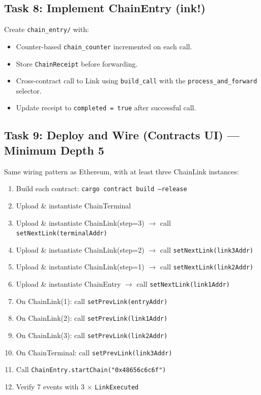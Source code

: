 \documentclass[11pt,a4paper]{article}
\begin{document}
\subsection{Task 8: Implement ChainEntry (ink!)}

Create \texttt{chain\_entry/} with:

\begin{itemize}
    \item Counter-based \texttt{chain\_counter} incremented on each call.
    \item Store \texttt{ChainReceipt} before forwarding.
    \item Cross-contract call to Link using \texttt{build\_call}
          with the \texttt{process\_and\_forward} selector.
    \item Update receipt to \texttt{completed = true} after successful call.
\end{itemize}

\subsection{Task 9: Deploy and Wire (Contracts UI) --- Minimum Depth 5}

Same wiring pattern as Ethereum, with at least three ChainLink instances:

\begin{enumerate}
    \item Build each contract: \texttt{cargo contract build --release}
    \item Upload \& instantiate ChainTerminal
    \item Upload \& instantiate ChainLink(step=3)
          $\to$ call \texttt{setNextLink(terminalAddr)}
    \item Upload \& instantiate ChainLink(step=2)
          $\to$ call \texttt{setNextLink(link3Addr)}
    \item Upload \& instantiate ChainLink(step=1)
          $\to$ call \texttt{setNextLink(link2Addr)}
    \item Upload \& instantiate ChainEntry
          $\to$ call \texttt{setNextLink(link1Addr)}
    \item On ChainLink(1): call \texttt{setPrevLink(entryAddr)}
    \item On ChainLink(2): call \texttt{setPrevLink(link1Addr)}
    \item On ChainLink(3): call \texttt{setPrevLink(link2Addr)}
    \item On ChainTerminal: call \texttt{setPrevLink(link3Addr)}
    \item Call \texttt{ChainEntry.startChain("0x48656c6c6f")}
    \item Verify 7 events with 3 $\times$ \texttt{LinkExecuted}
\end{enumerate}
\end{document}
